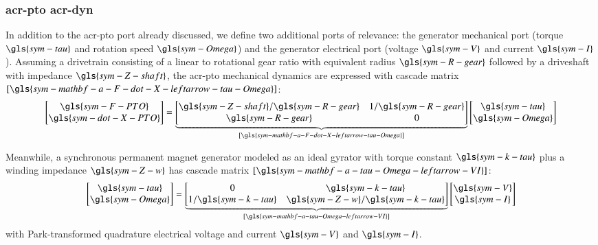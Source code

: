 \subsubsection{\gls{acr-pto} \gls{acr-dyn}}
\label{sec:appendix-pto-dynamics}
In addition to the \gls{acr-pto} port already discussed, we define two additional ports of relevance:
the generator mechanical port (torque $\gls{sym-tau}$ and rotation speed $\gls{sym-Omega}$)
and the generator electrical port (voltage $\gls{sym-V}$ and current $\gls{sym-I}$).
Assuming a drivetrain consisting of a linear to rotational gear ratio with equivalent radius $\gls{sym-R-gear}$ followed by a driveshaft with impedance $\gls{sym-Z-shaft}$,
the \gls{acr-pto} mechanical dynamics are expressed with cascade matrix
$[\gls{sym-mathbf-a-F-dot-X-leftarrow-tau-Omega}]$:
\begin{equation}\label{eq:mech-transmission-matrix}
\begin{bmatrix}
\gls{sym-F-PTO} \\ \gls{sym-dot-X-PTO}
\end{bmatrix}
=
\underbrace{\begin{bmatrix}
\gls{sym-Z-shaft}/\gls{sym-R-gear} & 1/\gls{sym-R-gear} \\
\gls{sym-R-gear} & 0
\end{bmatrix}}
_{[\gls{sym-mathbf-a-F-dot-X-leftarrow-tau-Omega}]}
\begin{bmatrix}
 \gls{sym-tau}\\ \gls{sym-Omega}
\end{bmatrix}
\end{equation}

Meanwhile, a synchronous permanent magnet generator modeled as an ideal gyrator with torque constant $\gls{sym-k-tau}$
plus a winding impedance $\gls{sym-Z-w}$ has cascade matrix $[\gls{sym-mathbf-a-tau-Omega-leftarrow-VI}]$:
\begin{equation}\label{eq:elec-transmission-matrix}
    \begin{bmatrix}
        \gls{sym-tau} \\ \gls{sym-Omega}
    \end{bmatrix}
    =
    \underbrace{\begin{bmatrix}
    0 & \gls{sym-k-tau} \\
    1/\gls{sym-k-tau} & \gls{sym-Z-w}/\gls{sym-k-tau}
    \end{bmatrix}}
    _{[\gls{sym-mathbf-a-tau-Omega-leftarrow-VI}]}
    \begin{bmatrix}
        \gls{sym-V} \\ \gls{sym-I}
    \end{bmatrix}
\end{equation}
with Park-transformed quadrature electrical voltage and current $\gls{sym-V}$ and $\gls{sym-I}$.

